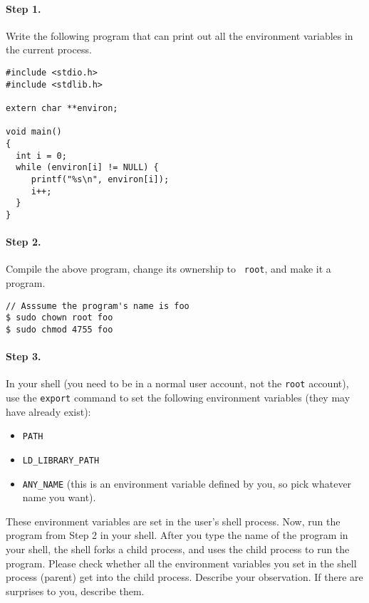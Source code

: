 \paragraph{Step 1.} Write the following program that can print out all
the environment variables in the current process.

\begin{lstlisting}
#include <stdio.h>
#include <stdlib.h>

extern char **environ;

void main()
{
  int i = 0;
  while (environ[i] != NULL) {
     printf("%s\n", environ[i]);
     i++;
  }
}
\end{lstlisting}


\paragraph{Step 2.} Compile the above program, change its ownership to {\tt
root}, and make it a \setuid program. 

\begin{lstlisting}
// Asssume the program's name is foo
$ sudo chown root foo
$ sudo chmod 4755 foo
\end{lstlisting}
 


\paragraph{Step 3.} In your shell (you need to be in a normal user account,
not the {\tt root} account), use the {\tt export} command to set the
following environment variables (they may have already exist):

\begin{itemize}[noitemsep]
\item {\tt PATH}
\item {\tt LD\_LIBRARY\_PATH}
\item {\tt ANY\_NAME} (this is an environment variable defined by you, so
pick whatever name you want).
\end{itemize}


These environment variables are set in the user's shell process.
Now, run the \setuid program from Step 2 in your shell. After you type the
name of the program in your shell, the shell forks a child process,
and uses the child process to run the program. Please check whether all the
environment variables you set in the shell process (parent) get into
the \setuid child process.  Describe your observation. If there are 
surprises to you, describe them.  



